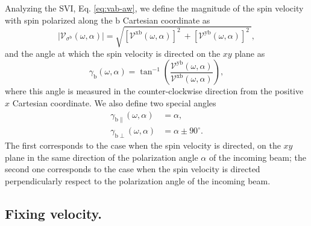\documentclass[prb,11pt,tightenlines,twocolumn,aps]{revtex4-1}
\begin{document}
Analyzing the SVI, Eq. \eqref{eq:vab-aw}, we define the magnitude of the spin
velocity with spin polarized along the $\mathrm{b}$ Cartesian coordinate as
\begin{equation}
|\mathcal{V}_{\sigma^{\mathrm{b}}}(\omega,\alpha)| 
=
\sqrt{
[\mathcal{V}^{\mathrm{xb}}(\omega,\alpha)]^{2}\ +
[\mathcal{V}^{\mathrm{yb}}(\omega,\alpha)]^{2}\ 
}, 
\label{eq:vs-mag}
\end{equation}
and the angle at which the spin velocity is directed on the $xy$ plane as
\begin{equation}
\gamma_{\mathrm{b}} (\omega,\alpha)
=
\tan^{-1} \left( \frac{\mathcal{V}^{\mathrm{yb}}(\omega,\alpha)}
{\mathcal{V}^{\mathrm{xb}}(\omega,\alpha)} \right),
\label{eq:gamma-ang}
\end{equation}
where this angle is measured in the counter-clockwise direction from the
positive $x$ Cartesian coordinate. We also define two special
angles
\begin{align}
\gamma_{\mathrm{b \parallel}}(\omega,\alpha) &= \alpha, 
\label{eq:gamma-par} 
\\
\gamma_{\mathrm{b \perp}}(\omega,\alpha) &= \alpha \pm 90^{\circ}.
\label{eq:gamma-perp}
\end{align}
The first corresponds to the case when the spin velocity is directed, on the
$xy$ plane in the same direction of the polarization angle $\alpha$ of the
incoming beam; the second one corresponds to the case when the spin velocity is
directed perpendicularly respect to the polarization angle of the incoming
beam.



\subsection{Fixing velocity.}\label{sec:theory-fixvel}
\end{document}

